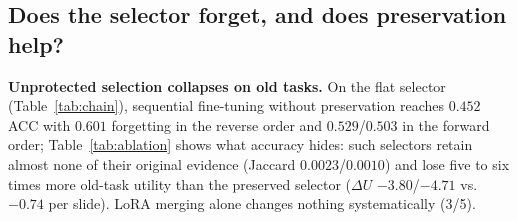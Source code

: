 \documentclass{article}
\begin{document}
\subsection{Does the selector forget, and does preservation help?}
\label{ssec:ablation}

\begin{table}[!htb]
\centering\footnotesize\renewcommand{\arraystretch}{0.92}
\setlength{\tabcolsep}{4pt}
\caption{\textbf{Leave-out chain in both task orders} (ConSlide benchmark, ten-fold CV; ACC mean$\pm$sd, forgetting mean). Reverse = ESCA$\rightarrow$RCC$\rightarrow$BRCA$\rightarrow$LUNG; forward = the opposite. The zero-shot reference selects the eight patches with the highest class-text cosine, pools them uniformly, and uses the frozen head; it learns nothing and therefore cannot forget. Last two rows: the strongest published method, as reported in \cite{gou2025qpmil} and as rerun by us with its released code.}
\label{tab:chain}
\end{table}

\textbf{Unprotected selection collapses on old tasks.} On the flat selector (Table~\ref{tab:chain}), sequential fine-tuning without preservation reaches $0.452$ ACC with $0.601$ forgetting in the reverse order and $0.529$/$0.503$ in the forward order; Table~\ref{tab:ablation} shows what accuracy hides: such selectors retain almost none of their original evidence (Jaccard $0.0023$/$0.0010$) and lose five to six times more old-task utility than the preserved selector ($\Delta U$ $-3.80$/$-4.71$ vs.\ $-0.74$ per slide). LoRA merging alone changes nothing systematically (3/5).
\end{document}
